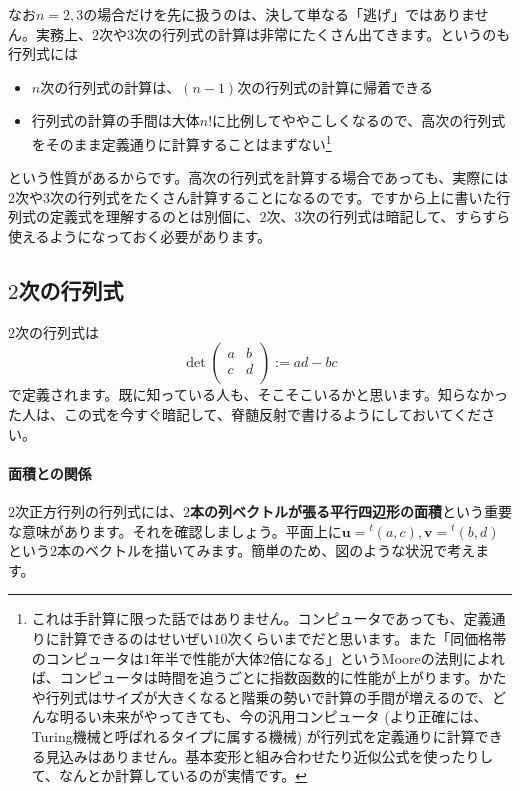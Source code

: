 なお$n = 2, 3$の場合だけを先に扱うのは、決して単なる「逃げ」ではありません。実務上、$2$次や$3$次の行列式の計算は非常にたくさん出てきます。というのも行列式には
\begin{itemize}
\item $n$次の行列式の計算は、$(n - 1)$次の行列式の計算に帰着できる
\item 行列式の計算の手間は大体$n!$に比例してややこしくなるので、高次の行列式をそのまま定義通りに計算することはまずない\footnote{これは手計算に限った話ではありません。コンピュータであっても、定義通りに計算できるのはせいぜい$10$次くらいまでだと思います。また「同価格帯のコンピュータは$1$年半で性能が大体$2$倍になる」というMooreの法則によれば、コンピュータは時間を追うごとに指数函数的に性能が上がります。かたや行列式はサイズが大きくなると階乗の勢いで計算の手間が増えるので、どんな明るい未来がやってきても、今の汎用コンピュータ (より正確には、Turing機械と呼ばれるタイプに属する機械) が行列式を定義通りに計算できる見込みはありません。基本変形と組み合わせたり近似公式を使ったりして、なんとか計算しているのが実情です。}
\end{itemize}
という性質があるからです。高次の行列式を計算する場合であっても、実際には$2$次や$3$次の行列式をたくさん計算することになるのです。ですから上に書いた行列式の定義式を理解するのとは別個に、$2$次、$3$次の行列式は暗記して、すらすら使えるようになっておく必要があります。

\subsection{$2$次の行列式}

$2$次の行列式は
\[
\det
\begin{pmatrix}
a & b \\
c & d \\
\end{pmatrix}
:= ad-bc
\]
で定義されます。既に知っている人も、そこそこいるかと思います。知らなかった人は、この式を今すぐ暗記して、脊髄反射で書けるようにしておいてください。

\paragraph{面積との関係} $2$次正方行列の行列式には、\textbf{$2$本の列ベクトルが張る平行四辺形の面積}という重要な意味があります。それを確認しましょう。平面上に$\bm{u} = {}^t(a, c), \bm{v} = {}^t(b, d)$という$2$本のベクトルを描いてみます。簡単のため、図のような状況で考えます。

